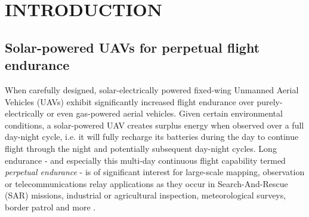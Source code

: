 \section{INTRODUCTION}

\subsection{Solar-powered UAVs for perpetual flight endurance}

When carefully designed, solar-electrically powered fixed-wing Unmanned Aerial Vehicles (UAVs) exhibit significantly increased flight endurance over purely-electrically or even gas-powered aerial vehicles. Given certain environmental conditions, a solar-powered UAV creates surplus energy when observed over a full day-night cycle, i.e. it will fully recharge its batteries during the day to continue flight through the night and potentially subsequent day-night cycles. Long endurance - and especially this multi-day continuous flight capability termed \textit{perpetual endurance} - is of significant interest for large-scale mapping, observation or telecommunications relay applications as they occur in Search-And-Rescue (SAR) missions, industrial or agricultural inspection, meteorological surveys, border patrol and more \cite{NASA_Pathfinder}.
 
